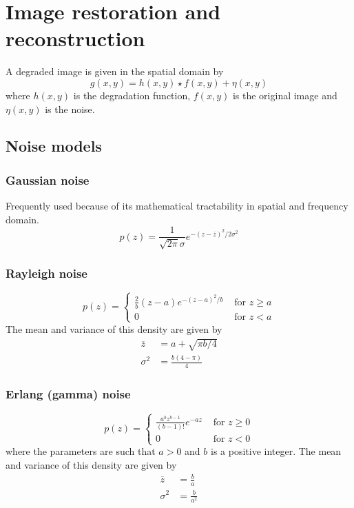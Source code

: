 \section{Image restoration and reconstruction }
A degraded image is given in the spatial domain by
\begin{equation}
	g(x,y) = h(x,y) \star f(x,y) + \eta(x,y)
\end{equation}
where $h(x,y)$ is the degradation function, $f(x,y)$ is the original image and $\eta(x,y)$ is the noise.

\subsection{Noise models  }
	\subsubsection{Gaussian noise}
		Frequently used because of its mathematical tractability in spatial and frequency domain.
		\begin{equation}
			p(z) = \frac{1}{\sqrt{2\pi} \sigma} e^{-\left(z-\overline{z}\right)^2 / 2\sigma^2}
		\end{equation}

	\subsubsection{Rayleigh noise}
		\begin{equation}
			p(z) =
				\begin{cases}
					\frac{2}{b} \left(z-a\right) e^{-\left(z-a\right)^2/b} & \text{ for } z\geq a \\
					0 & \text{ for } z < a
				\end{cases}
		\end{equation}
		The mean and variance of this density are given by
		\begin{align}
			\overline{z} &= a + \sqrt{\pi b / 4} \\
			\sigma^2 &= \frac{b\left(4-\pi\right)}{4}
		\end{align}

	\subsubsection{Erlang (gamma) noise}
		\begin{equation}
			p(z) =
				\begin{cases}
					\frac{a^bz^{b-1}}{\left(b-1\right)!} e^{-az} & \text{ for } z \geq 0 \\
					0 & \text{ for } z < 0
				\end{cases}
		\end{equation}
		where the parameters are such that $a>0$ and $b$ is a positive integer. The mean and variance of this density are given by
		\begin{align}
			\overline{z} &= \frac{b}{a} \\
			\sigma^2 &= \frac{b}{a^2}
		\end{align}

